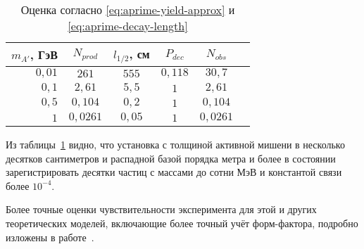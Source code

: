 \begin{table}[h]
\centering
\begin{tabular}{r|ccccc}
 $m_{A'}$, ГэВ & $N_{prod}$ & $l_{1/2}$, см & $P_{dec}$ & $N_{obs}$ \\ \hline
$0{,}01$ & $261$        & $555$    &  $0{,}118$ & $30{,}7$ \\
 $0{,}1$ & $2{,}61$     & $5{,}5$  &  $1$       & $2{,}61$ \\
 $0{,}5$ & $0{,}104$    & $0{,}2$  &  $1$       & $0{,}104$ \\
     $1$ & $0{,}0261$   & $0{,}05$ &  $1$       & $0{,}0261$
\end{tabular}
\caption{Оценка согласно \eqref{eq:aprime-yield-approx} и \eqref{eq:aprime-decay-length}}
\label{tab:aprime-geom-yield-estimations}
\end{table}

Из таблицы~\ref{tab:aprime-geom-yield-estimations} видно, что установка
с толщиной активной мишени в несколько десятков сантиметров и распадной
базой порядка метра и более в состоянии зарегистрировать десятки
частиц с массами до сотни МэВ и константой связи более $10^{-4}$.

Более точные оценки чувствительности эксперимента для этой и других
теоретических моделей, включающие более точный учёт форм-фактора,
подробно изложены в работе~\cite{voronchihin2025}.
